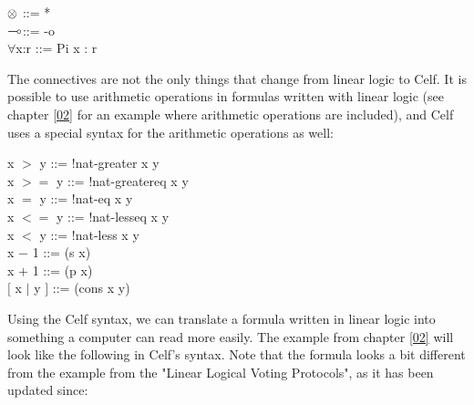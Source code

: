 \begin{texto}
	$\otimes$\hspace{40pt} ::= * \\
	$\multimap$\hspace{40pt}::= -o \\
	$\forall$x:r\hspace{30pt} ::= Pi x : r \\
\end{texto}

The connectives are not the only things that change from linear logic to Celf. It is possible to use arithmetic operations in formulas written with linear logic (see chapter \ref{02} for an example where arithmetic operations are included), and Celf uses a special syntax for the arithmetic operations as well:

\begin{texto}
	x $>$ y\hspace{22.8pt} ::= !nat-greater x y \\
	x $>=$ y\hspace{15pt} ::= !nat-greatereq x y \\
	x $=$ y\hspace{22.8pt} ::= !nat-eq x y \\
	x $<=$ y\hspace{15pt} ::= !nat-lesseq x y \\
	x $<$ y\hspace{22.8pt} ::= !nat-less x y \\
 	x $-$ 1\hspace{22.8pt} ::= (s x) \\
 	x $+$ 1\hspace{22.8pt} ::= (p x) \\
	$\lbrack$ x $|$ y $\rbrack$ \hspace{12pt} ::= (cons x y)
\end{texto}

Using the Celf syntax, we can translate a formula written in linear logic into something a computer can read more easily. The example from chapter \ref{02} will look like the following in Celf's syntax. Note that the formula looks a bit different from the example from the "{L}inear {L}ogical {V}oting {P}rotocols"\cite{Deyoung11}, as it has been updated since:

